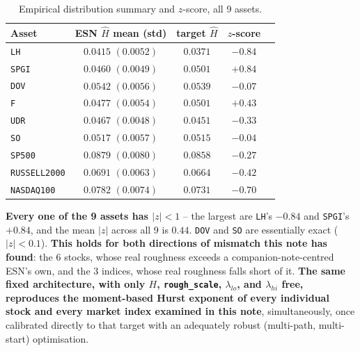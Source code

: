 \documentclass[11pt]{article}
\begin{document}
\begin{table}[h]
\centering
\caption{Empirical distribution summary and $z$-score, all 9 assets.}
\label{tab:zscores}
\begin{tabular}{lcccc}
\toprule
Asset & ESN $\hat H$ mean (std) & target $\hat H$ & $z$-score \\
\midrule
\texttt{LH}          & $0.0415$ $(0.0052)$ & $0.0371$ & $-0.84$ \\
\texttt{SPGI}        & $0.0460$ $(0.0049)$ & $0.0501$ & $+0.84$ \\
\texttt{DOV}         & $0.0542$ $(0.0056)$ & $0.0539$ & $-0.07$ \\
\texttt{F}           & $0.0477$ $(0.0054)$ & $0.0501$ & $+0.43$ \\
\texttt{UDR}         & $0.0467$ $(0.0048)$ & $0.0451$ & $-0.33$ \\
\texttt{SO}          & $0.0517$ $(0.0057)$ & $0.0515$ & $-0.04$ \\
\texttt{SP500}       & $0.0879$ $(0.0080)$ & $0.0858$ & $-0.27$ \\
\texttt{RUSSELL2000} & $0.0691$ $(0.0063)$ & $0.0664$ & $-0.42$ \\
\texttt{NASDAQ100}   & $0.0782$ $(0.0074)$ & $0.0731$ & $-0.70$ \\
\bottomrule
\end{tabular}
\end{table}

\textbf{Every one of the 9 assets has $|z|<1$} -- the largest are \texttt{LH}'s
$-0.84$ and \texttt{SPGI}'s $+0.84$, and the mean $|z|$ across all 9 is $0.44$.
\texttt{DOV} and \texttt{SO} are essentially exact ($|z|<0.1$). \textbf{This holds
for both directions of mismatch this note has found}: the 6 stocks, whose real
roughness exceeds a companion-note-centred ESN's own, and the 3 indices, whose real
roughness falls short of it. \textbf{The same fixed architecture, with only $H$,
\texttt{rough\_scale}, $\lambda_{lo}$, and $\lambda_{hi}$ free, reproduces the
moment-based Hurst exponent of every individual stock and every market index
examined in this note}, simultaneously, once calibrated directly to that target
with an adequately robust (multi-path, multi-start) optimisation.
\end{document}
